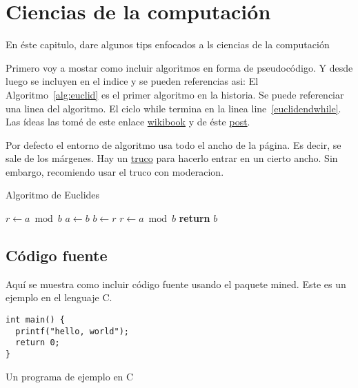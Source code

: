 \chapter{Ciencias de la computación}
\label{chap:cs}

En éste capitulo, dare algunos tips enfocados a ls ciencias de la computación

Primero voy a mostar como incluir algoritmos en forma de pseudocódigo.
Y desde luego se incluyen en el indice y se pueden referencias asi: El Algoritmo~\ref{alg:euclid} es el primer algoritmo en la historia. Se puede referenciar una linea del algoritmo. El ciclo while termina en la linea line~\ref{euclidendwhile}. 
Las ídeas las tomé de este enlace \href{https://en.wikibooks.org/wiki/LaTeX/Algorithms#Typesetting_using_the_algorithmicx_package}{wikibook} y de éste \href{https://tex.stackexchange.com/questions/229355/algorithm-algorithmic-algorithmicx-algorithm2e-algpseudocode-confused}{post}.

Por defecto el entorno de algoritmo usa todo el ancho de la página.
Es decir, se sale de los márgenes.
Hay un \href{https://tex.stackexchange.com/questions/350434/adjust-width-of-algorithm-float}{truco} para hacerlo entrar en un cierto ancho. Sin embargo, recomiendo usar el truco con moderacion.

\begin{algorithm}[H]
\caption{Algoritmo de Euclides}
\label{alg:euclid}
\begin{algorithmic}[1] %
     
    \State $r\gets a \bmod b$
     
        \State $a \gets b$
        \State $b \gets r$
        \State $r \gets a \bmod b$
    \EndWhile\label{euclidendwhile}
    \State \textbf{return} $b$
    \EndProcedure
\end{algorithmic}
\end{algorithm}


\section{Código fuente}
Aquí se muestra como incluir código fuente usando el paquete mined.
Este es un ejemplo en el lenguaje C.
\begin{listing}
\begin{verbatim}
int main() {
  printf("hello, world");
  return 0;
}
\end{verbatim}
\caption{Un programa de ejemplo en C}\label{lst:hello}
\end{listing}

